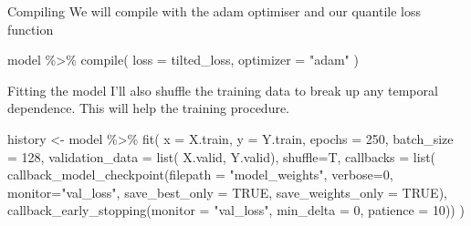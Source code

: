 \documentclass[
  ignorenonframetext,
]{beamer}
\newenvironment{Shaded}{\begin{snugshade}}{\end{snugshade}}
\newcommand{\AttributeTok}[1]{\textcolor[rgb]{0.77,0.63,0.00}{#1}}
\newcommand{\ConstantTok}[1]{\textcolor[rgb]{0.00,0.00,0.00}{#1}}
\newcommand{\DecValTok}[1]{\textcolor[rgb]{0.00,0.00,0.81}{#1}}
\newcommand{\FunctionTok}[1]{\textcolor[rgb]{0.00,0.00,0.00}{#1}}
\newcommand{\NormalTok}[1]{#1}
\newcommand{\OtherTok}[1]{\textcolor[rgb]{0.56,0.35,0.01}{#1}}
\newcommand{\SpecialCharTok}[1]{\textcolor[rgb]{0.00,0.00,0.00}{#1}}
\newcommand{\StringTok}[1]{\textcolor[rgb]{0.31,0.60,0.02}{#1}}
\begin{document}
\begin{frame}[fragile]{Compiling}
\protect\hypertarget{compiling}{}
We will compile with the adam optimiser and our quantile loss function

\begin{Shaded}
\begin{Highlighting}[]
\NormalTok{model }\SpecialCharTok{\%\textgreater{}\%} \FunctionTok{compile}\NormalTok{(}
  \AttributeTok{loss =}\NormalTok{ tilted\_loss,}
  \AttributeTok{optimizer =} \StringTok{"adam"}
\NormalTok{)}
\end{Highlighting}
\end{Shaded}
\end{frame}

\begin{frame}[fragile]{Fitting the model}
\protect\hypertarget{fitting-the-model}{}
I'll also shuffle the training data to break up any temporal dependence.
This will help the training procedure.

\begin{Shaded}
\begin{Highlighting}[]
\NormalTok{history }\OtherTok{\textless{}{-}}\NormalTok{ model }\SpecialCharTok{\%\textgreater{}\%} \FunctionTok{fit}\NormalTok{(}
  \AttributeTok{x =}\NormalTok{ X.train, }\AttributeTok{y =}\NormalTok{ Y.train,}
  \AttributeTok{epochs =} \DecValTok{250}\NormalTok{, }\AttributeTok{batch\_size =} \DecValTok{128}\NormalTok{, }
  \AttributeTok{validation\_data =} \FunctionTok{list}\NormalTok{(}
\NormalTok{    X.valid, Y.valid),}
  \AttributeTok{shuffle=}\NormalTok{T,}
  \AttributeTok{callbacks =}  \FunctionTok{list}\NormalTok{(}
    \FunctionTok{callback\_model\_checkpoint}\NormalTok{(}\AttributeTok{filepath =} \StringTok{"model\_weights"}\NormalTok{,}
      \AttributeTok{verbose=}\DecValTok{0}\NormalTok{, }\AttributeTok{monitor=}\StringTok{"val\_loss"}\NormalTok{,}
      \AttributeTok{save\_best\_only =} \ConstantTok{TRUE}\NormalTok{, }\AttributeTok{save\_weights\_only =} \ConstantTok{TRUE}\NormalTok{),}
      \FunctionTok{callback\_early\_stopping}\NormalTok{(}\AttributeTok{monitor =} \StringTok{"val\_loss"}\NormalTok{, }
                          \AttributeTok{min\_delta =} \DecValTok{0}\NormalTok{, }\AttributeTok{patience =} \DecValTok{10}\NormalTok{))}
\NormalTok{)}
\end{Highlighting}
\end{Shaded}


\end{frame}
\end{document}
